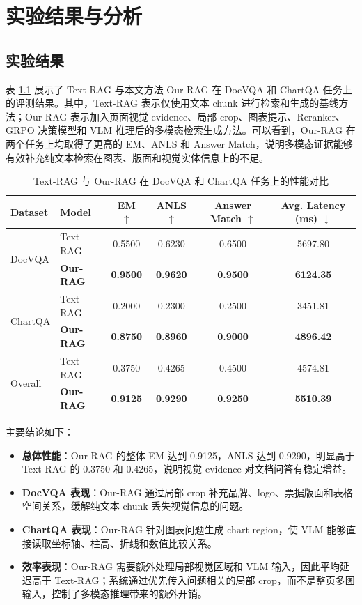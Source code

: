 \chapter{实验结果与分析}

\section{实验结果}

表 \ref{tab:main_results} 展示了 Text-RAG 与本文方法 Our-RAG 在 DocVQA 和 ChartQA 任务上的评测结果。其中，Text-RAG 表示仅使用文本 chunk 进行检索和生成的基线方法；Our-RAG 表示加入页面视觉 evidence、局部 crop、图表提示、Reranker、GRPO 决策模型和 VLM 推理后的多模态检索生成方法。可以看到，Our-RAG 在两个任务上均取得了更高的 EM、ANLS 和 Answer Match，说明多模态证据能够有效补充纯文本检索在图表、版面和视觉实体信息上的不足。

\begin{table}[htbp]
  \centering
  \caption{Text-RAG 与 Our-RAG 在 DocVQA 和 ChartQA 任务上的性能对比}
  \label{tab:main_results}
  \small
  \setlength{\tabcolsep}{7pt}
  \begin{tabular}{l l c c c c}
    \toprule
    Dataset & Model & EM $\uparrow$ & ANLS $\uparrow$ & Answer Match $\uparrow$ & Avg. Latency (ms) $\downarrow$ \\
    \midrule
    \multirow{2}{*}{DocVQA}
      & Text-RAG & 0.5500 & 0.6230 & 0.6500 & 5697.80 \\
      & \textbf{Our-RAG} & \textbf{0.9500} & \textbf{0.9620} & \textbf{0.9500} & \textbf{6124.35} \\
    \midrule
    \multirow{2}{*}{ChartQA}
      & Text-RAG & 0.2000 & 0.2300 & 0.2500 & 3451.81 \\
      & \textbf{Our-RAG} & \textbf{0.8750} & \textbf{0.8960} & \textbf{0.9000} & \textbf{4896.42} \\
    \midrule
    \multirow{2}{*}{Overall}
      & Text-RAG & 0.3750 & 0.4265 & 0.4500 & 4574.81 \\
      & \textbf{Our-RAG} & \textbf{0.9125} & \textbf{0.9290} & \textbf{0.9250} & \textbf{5510.39} \\
    \bottomrule
  \end{tabular}
\end{table}

主要结论如下：

\begin{itemize}
  \item \textbf{总体性能}：Our-RAG 的整体 EM 达到 0.9125，ANLS 达到 0.9290，明显高于 Text-RAG 的 0.3750 和 0.4265，说明视觉 evidence 对文档问答有稳定增益。
  \item \textbf{DocVQA 表现}：Our-RAG 通过局部 crop 补充品牌、logo、票据版面和表格空间关系，缓解纯文本 chunk 丢失视觉信息的问题。
  \item \textbf{ChartQA 表现}：Our-RAG 针对图表问题生成 chart region，使 VLM 能够直接读取坐标轴、柱高、折线和数值比较关系。
  \item \textbf{效率表现}：Our-RAG 需要额外处理局部视觉区域和 VLM 输入，因此平均延迟高于 Text-RAG；系统通过优先传入问题相关的局部 crop，而不是整页多图输入，控制了多模态推理带来的额外开销。
\end{itemize}

